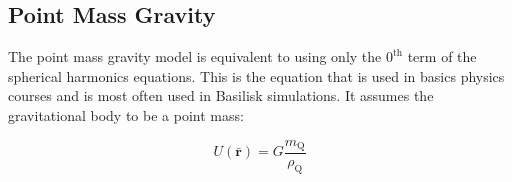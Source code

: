 \subsection{Point Mass Gravity}
The point mass gravity model is equivalent to using only the $0^{\text{th}}$ term of the spherical harmonics equations. This is the equation that is used in basics physics courses and is most often used in Basilisk simulations. It assumes the gravitational body to be a point mass:

\begin{equation}
U(\mathbf{\bar r}) = G \frac{ m_\text{Q}}{\rho_\text{Q}}
\end{equation}
